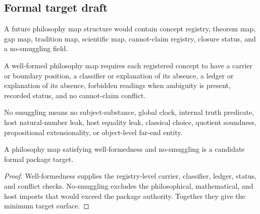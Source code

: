 \subsection{Formal target draft}
\label{subsec:philosophy-package-formal-target-draft}

\begin{definition}
\label{def:philosophy-map-target}
A future philosophy map structure would contain concept registry,
theorem map, gap map, tradition map, scientific map, cannot-claim
registry, closure status, and a no-smuggling field.
\end{definition}

\begin{definition}
\label{def:philosophy-well-formed-map}
A well-formed philosophy map requires each registered concept to have a
carrier or boundary position, a classifier or explanation of its
absence, a ledger or explanation of its absence, forbidden readings
when ambiguity is present, recorded status, and no cannot-claim
conflict.
\end{definition}

\begin{definition}[No smuggling]
\label{def:philosophy-package-no-smuggling}
No smuggling means no subject-substance, global clock, internal truth
predicate, host natural-number leak, host equality leak, classical
choice, quotient soundness, propositional extensionality, or
object-level far-end entity.
\end{definition}


\begin{theorem}
\label{thm:philosophy-formal-package-target-criterion}
A philosophy map satisfying well-formedness and no-smuggling is a
candidate formal package target.
\end{theorem}
\begin{proof}
Well-formedness supplies the registry-level carrier, classifier,
ledger, status, and conflict checks. No-smuggling excludes the
philosophical, mathematical, and host imports that would exceed the
package authority. Together they give the minimum target surface.
\end{proof}

